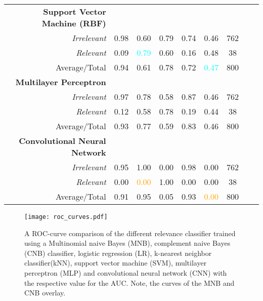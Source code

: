 \begin{table}[h!]
\begin{tabular}{@{}rcccccccc@{}}
      \textbf{Support Vector Machine (RBF)}\\
      \textsl{Irrelevant}& 0.98& 0.60&  0.79& 0.74& 0.46& 762 \\
      \textsl{Relevant}& 0.09& \textcolor{cyan}{0.79}&  0.60& 0.16& 0.48& 38 \\
      Average/Total& 0.94& 0.61& 0.78& 0.72& \textcolor{cyan}{0.47}& 800 \vspace{2mm}\\
      \textbf{Multilayer Perceptron}\\
      \textsl{Irrelevant}& 0.97& 0.78&  0.58& 0.87& 0.46& 762 \\
      \textsl{Relevant}& 0.12& 0.58&  0.78& 0.19& 0.44& 38 \\
      Average/Total& 0.93& 0.77& 0.59& 0.83& 0.46& 800 \\
      \textbf{Convolutional Neural Network}\\
      \textsl{Irrelevant}& 0.95& 1.00&  0.00& 0.98& 0.00& 762 \\
      \textsl{Relevant}& 0.00& \textcolor{orange}{0.00}&  1.00& 0.00& 0.00& 38 \\
      Average/Total& 0.91& 0.95& 0.05& 0.93& \textcolor{orange}{0.00}& 800 \\
      \bottomrule
    \end{tabular}
  \label{table:recommender_performance}
  \end{table}

  \begin{figure}[h!]
    \centering
    \texttt{[image: roc\_curves.pdf]}
    \caption{A ROC-curve comparison of the different relevance classifier trained using a Multinomial naive Bayes (MNB), complement naive Bayes (CNB) classifier, logistic regression (LR), k-nearest neighbor classifier(kNN), support vector machine (SVM), multilayer perceptron (MLP) and convolutional neural network (CNN) with the respective value for the AUC. Note, the curves of the MNB and CNB overlay.}
  \label{fig:roc}
  \end{figure}

